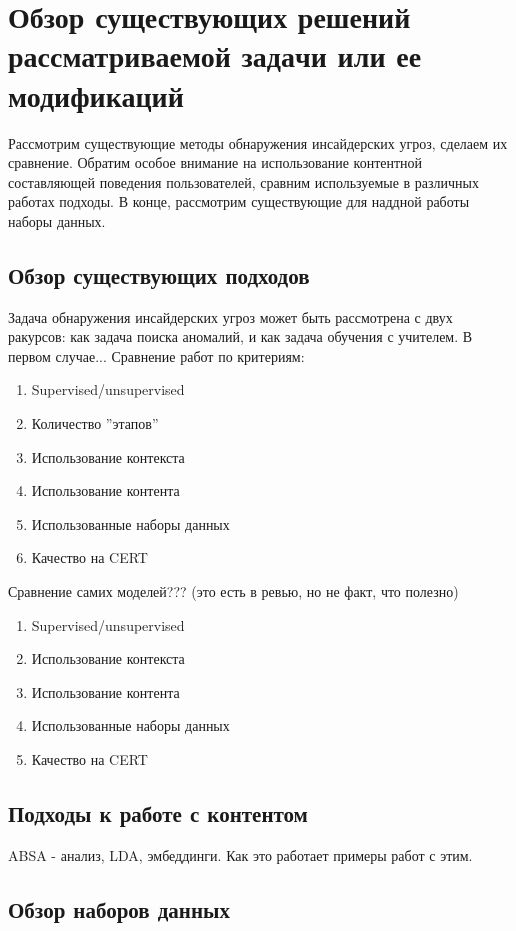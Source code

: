 \section{Обзор существующих решений рассматриваемой зада­чи или ее модификаций}
Рассмотрим существующие методы обнаружения инсайдерских угроз, сделаем их сравнение. Обратим особое внимание на использование контентной составляющей поведения пользователей, сравним используемые в различных работах подходы. В конце, рассмотрим существующие для наддной работы наборы данных.
\subsection{Обзор существующих подходов}
Задача обнаружения инсайдерских угроз может быть рассмотрена с двух ракурсов: как задача поиска аномалий, и как задача обучения с учителем.
В первом случае...
Сравнение работ по критериям:
\begin{enumerate}
\item Supervised/unsupervised
\item Количество ''этапов''
\item Использование контекста
\item Использование контента
\item Использованные наборы данных
\item Качество на CERT
\end{enumerate}
Сравнение самих моделей??? (это есть в ревью, но не факт, что полезно)
\begin{enumerate}
\item Supervised/unsupervised
\item Использование контекста
\item Использование контента
\item Использованные наборы данных
\item Качество на CERT
\end{enumerate}
\subsection{Подходы к работе с контентом}
ABSA - анализ, LDA, эмбеддинги. Как это работает примеры работ с этим.
\subsection{Обзор наборов данных}
\clearpage